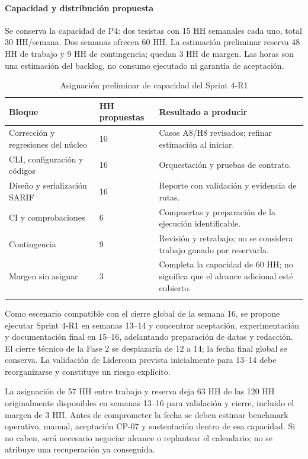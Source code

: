 \paragraph*{Capacidad y distribución propuesta}
Se conserva la capacidad de P4: dos tesistas con 15 HH semanales cada uno, total 30 HH/semana. Dos semanas ofrecen 60 HH. La estimación preliminar reserva 48 HH de trabajo y 9 HH de contingencia; quedan 3 HH de margen. Las horas son una estimación del backlog, no consumo ejecutado ni garantía de aceptación.
\begin{table}[H]
\centering\small{}
\caption{Asignación preliminar de capacidad del Sprint 4-R1}
\begin{tabularx}{\textwidth}{P{3cm}YY}
\toprule
\textbf{Bloque} & \textbf{HH propuestas} & \textbf{Resultado a producir} \\
\midrule
Corrección y regresiones del núcleo & 10 & Casos A8/H8 revisados; refinar estimación al iniciar. \\
\addlinespace
CLI, configuración y códigos & 16 & Orquestación y pruebas de contrato. \\
\addlinespace
Diseño y serialización SARIF & 16 & Reporte con validación y evidencia de rutas. \\
\addlinespace
CI y comprobaciones & 6 & Compuertas y preparación de la ejecución identificable. \\
\addlinespace
Contingencia & 9 & Revisión y retrabajo; no se considera trabajo ganado por reservarla. \\
\addlinespace
Margen sin asignar & 3 & Completa la capacidad de 60 HH; no significa que el alcance adicional esté cubierto. \\
\addlinespace
\bottomrule
\end{tabularx}
\end{table}
Como escenario compatible con el cierre global de la semana 16, se propone ejecutar Sprint 4-R1 en semanas 13--14 y concentrar aceptación, experimentación y documentación final en 15--16, adelantando preparación de datos y redacción. El cierre técnico de la Fase 2 se desplazaría de 12 a 14; la fecha final global se conserva. La validación de Lidercom prevista inicialmente para 13--14 debe reorganizarse y constituye un riesgo explícito.

La asignación de 57 HH entre trabajo y reserva deja 63 HH de las 120 HH originalmente disponibles en semanas 13--16 para validación y cierre, incluido el margen de 3 HH. Antes de comprometer la fecha se deben estimar benchmark operativo, manual, aceptación CP-07 y sustentación dentro de esa capacidad. Si no caben, será necesario negociar alcance o replantear el calendario; no se atribuye una recuperación ya conseguida.

